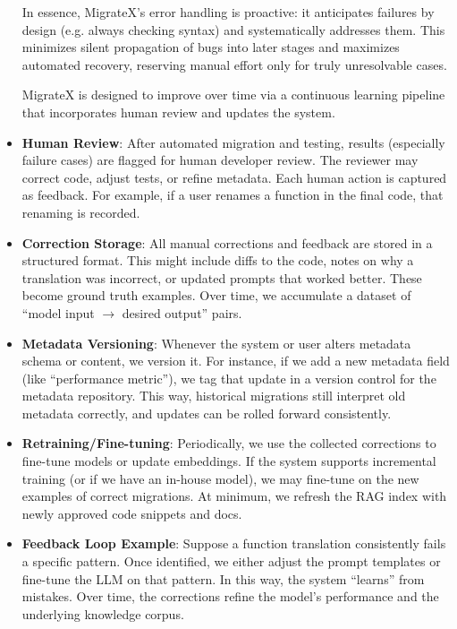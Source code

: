 \documentclass[twocolumn]{article}
\begin{document}
\begin{itemize}
    In essence, MigrateX’s error handling is proactive: it anticipates failures by design (e.g. always checking syntax) and systematically addresses them. This minimizes silent propagation of bugs into later stages and maximizes automated recovery, reserving manual effort only for truly unresolvable cases.

    MigrateX is designed to improve over time via a continuous learning pipeline that incorporates human review and updates the system.

    \item \textbf{Human Review}: After automated migration and testing, results (especially failure cases) are flagged for human developer review. The reviewer may correct code, adjust tests, or refine metadata. Each human action is captured as feedback. For example, if a user renames a function in the final code, that renaming is recorded.

    \item \textbf{Correction Storage}: All manual corrections and feedback are stored in a structured format. This might include diffs to the code, notes on why a translation was incorrect, or updated prompts that worked better. These become ground truth examples. Over time, we accumulate a dataset of ``model input $\rightarrow$ desired output'' pairs.

    \item \textbf{Metadata Versioning}: Whenever the system or user alters metadata schema or content, we version it. For instance, if we add a new metadata field (like ``performance metric''), we tag that update in a version control for the metadata repository. This way, historical migrations still interpret old metadata correctly, and updates can be rolled forward consistently.

    \item \textbf{Retraining/Fine-tuning}: Periodically, we use the collected corrections to fine-tune models or update embeddings. If the system supports incremental training (or if we have an in-house model), we may fine-tune on the new examples of correct migrations. At minimum, we refresh the RAG index with newly approved code snippets and docs.

    \item \textbf{Feedback Loop Example}: Suppose a function translation consistently fails a specific pattern. Once identified, we either adjust the prompt templates or fine-tune the LLM on that pattern. In this way, the system ``learns'' from mistakes. Over time, the corrections refine the model’s performance and the underlying knowledge corpus.
\end{itemize}
\end{document}

